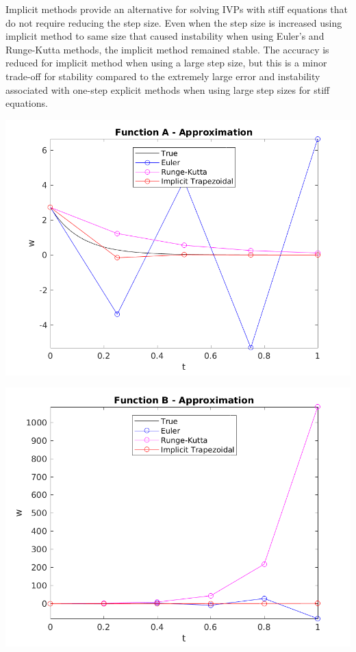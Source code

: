\documentclass{article}
\begin{document}
Implicit methods provide an alternative for solving IVPs with stiff equations that do not require reducing the step size. Even when the step size is increased using implicit method to same size that caused instability when using Euler's and Runge-Kutta methods, the implicit method remained stable. The accuracy is reduced for implicit method when using a large step size, but this is a minor trade-off for stability compared to the extremely large error and instability associated with one-step explicit methods when using large step sizes for stiff equations.


\begin{center}
	\centering
    \begin{minipage}{0.5\textwidth}
        \centering
	    \includegraphics[width=1\textwidth]{../additional/unstable/a_compare_val.png}
    \end{minipage}\hfill
    \begin{minipage}{0.5\textwidth}
        \centering
	    \includegraphics[width=1\textwidth]{../additional/unstable/b_compare_val.png}
    \end{minipage}
 	\label{fig:un_compare_val}
\end{center}
\end{document}
